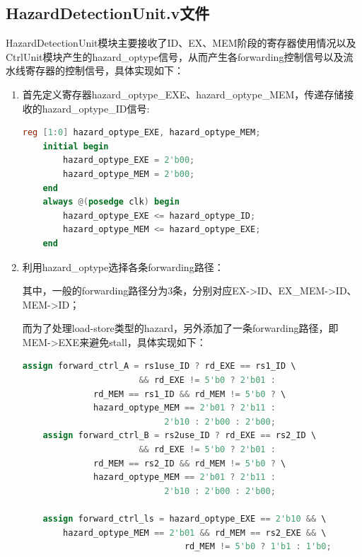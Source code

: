 \documentclass{article}
\begin{document}
\subsection{HazardDetectionUnit.v文件}
HazardDetectionUnit模块主要接收了ID、EX、MEM阶段的寄存器使用情况以及CtrlUnit模块产生的hazard\_optype信号，从而产生各forwarding控制信号以及流水线寄存器的控制信号，具体实现如下：\par
\begin{enumerate}
    \item 首先定义寄存器hazard\_optype\_EXE、hazard\_optype\_MEM，传递存储接收的hazard\_optype\_ID信号:\par
\begin{lstlisting}[language=Verilog]
    reg [1:0] hazard_optype_EXE, hazard_optype_MEM;
    initial begin
        hazard_optype_EXE = 2'b00;
        hazard_optype_MEM = 2'b00;
    end
    always @(posedge clk) begin
        hazard_optype_EXE <= hazard_optype_ID;
        hazard_optype_MEM <= hazard_optype_EXE;
    end
\end{lstlisting}
    \item 利用hazard\_optype选择各条forwarding路径：\par
    其中，一般的forwarding路径分为3条，分别对应EX-\textgreater{}ID、EX\_MEM-\textgreater{}ID、MEM-\textgreater{}ID；\par
    而为了处理load-store类型的hazard，另外添加了一条forwarding路径，即MEM-\textgreater{}EXE来避免stall，具体实现如下：\par
\begin{lstlisting}[language=Verilog]
    assign forward_ctrl_A = rs1use_ID ? rd_EXE == rs1_ID \
                       && rd_EXE != 5'b0 ? 2'b01 :
              rd_MEM == rs1_ID && rd_MEM != 5'b0 ? \
              hazard_optype_MEM == 2'b01 ? 2'b11 :
                            2'b10 : 2'b00 : 2'b00;
    assign forward_ctrl_B = rs2use_ID ? rd_EXE == rs2_ID \
                       && rd_EXE != 5'b0 ? 2'b01 :
              rd_MEM == rs2_ID && rd_MEM != 5'b0 ? \
              hazard_optype_MEM == 2'b01 ? 2'b11 :
                            2'b10 : 2'b00 : 2'b00;

    assign forward_ctrl_ls = hazard_optype_EXE == 2'b10 && \
        hazard_optype_MEM == 2'b01 && rd_MEM == rs2_EXE && \
                                rd_MEM != 5'b0 ? 1'b1 : 1'b0;
\end{lstlisting}


\end{enumerate}
\end{document}
